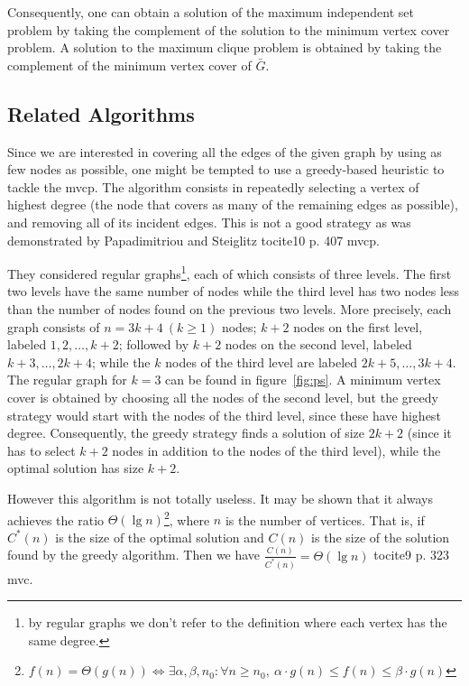 \documentclass[12pt]{article}
\begin{document}
Consequently, one can obtain a solution of the maximum independent set
problem by taking the complement of the solution to the minimum vertex cover
problem. A solution to the maximum clique problem is obtained by
taking the complement of the minimum vertex cover of $\bar{G}$.

\subsection{Related Algorithms}
\label{sec:ra}
Since we are interested in covering all the edges of the
given graph by using as few nodes as possible, one might
be tempted to use a greedy-based heuristic to tackle the
mvcp.
The algorithm consists in repeatedly selecting a
vertex of highest degree (the node that covers as many
of the remaining edges as possible), and removing all
of its incident edges.
This is not a good strategy as was demonstrated
by Papadimitriou and Steiglitz tocite{10 p. 407 mvcp}.

They considered regular graphs\footnote{%
by regular graphs we don't refer to the definition where
each vertex has the same degree.
}, each of which consists of three levels.
The first two levels have the same
number of nodes while the third level has two nodes less
than the number of nodes found on the previous two
levels.
More precisely, each graph consists of $n = 3k + 4 \ (k \geq 1)$
nodes; $k+2$ nodes on the first level, labeled $1, 2, \dots, k+2$;
followed by $k+2$ nodes on the second level, labeled $k+3, \dots, 2k+4$;
while the $k$ nodes of the third level are labeled $2k+5, \dots, 3k+4$.
The regular graph for $k = 3$ can be found in figure~\ref{fig:ps}.
A minimum vertex cover is obtained by choosing all
the nodes of the second level, but the greedy strategy
would start with the nodes of the third level, since these
have highest degree. Consequently, the greedy strategy
finds a solution of size $2k + 2$ (since it has to select $k + 2$
nodes in addition to the nodes of the third level), while
the optimal solution has size $k + 2$.

However this algorithm is not totally useless. It may be shown that it always
achieves the ratio $\Theta(\lg n)$\footnote{$f(n) = \Theta(g(n)) \iff
\exists \alpha, \beta, n_0 : \forall n \geq n_0, \ 
\alpha \cdot g(n) \leq f(n) \leq \beta \cdot g(n)
$},
where $n$ is the number of vertices.
That is, if $C^*(n)$ is the size of the optimal
solution and $C(n)$ is the size of the solution found by the greedy
algorithm. Then we have $\frac{C(n)}{C^*(n)} = \Theta(\lg n)$ tocite{9 p. 323 mvc}.
\end{document}
